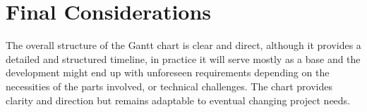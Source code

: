 \section{Final Considerations}
\label{sec:dev_plan_final}

The overall structure of the Gantt chart is clear and direct, although it provides a detailed and structured timeline, in practice it will serve mostly as a base and the development might end up with unforeseen requirements depending on the necessities of the parts involved, or technical challenges. The chart provides clarity and direction but remains adaptable to eventual changing project needs.

